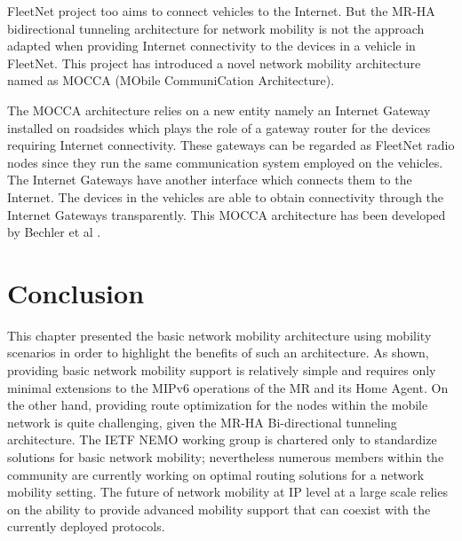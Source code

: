FleetNet \cite{53} project too aims to connect vehicles to the Internet. But
the MR-HA bidirectional tunneling architecture for network mobility is not the
approach adapted when providing Internet connectivity to the devices in a
vehicle in FleetNet. This project has introduced a novel network mobility
architecture named as MOCCA (MObile CommuniCation Architecture).

The MOCCA architecture relies on a new entity namely an Internet Gateway
installed on roadsides which plays the role of a gateway router for the
devices requiring Internet connectivity. These gateways can be regarded as
FleetNet radio nodes since they run the same communication system employed on
the vehicles. The Internet Gateways have another interface which connects them
to the Internet. The devices in the vehicles are able to obtain connectivity
through the Internet Gateways transparently. This MOCCA architecture has been
developed by Bechler et al \cite{54}.

\section{Conclusion}

This chapter presented the basic network mobility architecture using mobility
scenarios in order to highlight the benefits of such an architecture. As
shown, providing basic network mobility support is relatively simple and
requires only minimal extensions to the MIPv6 operations of the MR and its
Home Agent. On the other hand, providing route optimization for the nodes
within the mobile network is quite challenging, given the MR-HA Bi-directional
tunneling architecture. The IETF NEMO working group is chartered only to
standardize solutions for basic network mobility; nevertheless numerous
members within the community are currently working on optimal routing
solutions for a network mobility setting. The future of network mobility at IP
level at a large scale relies on the ability to provide advanced mobility
support that can coexist with the currently deployed protocols.

